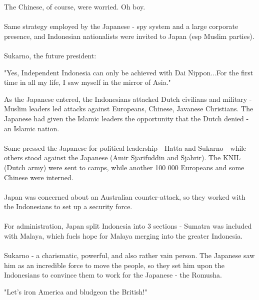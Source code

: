 \documentclass[a4paper]{article}
\begin{document}
\noindent The Chinese, of course, were worried. Oh boy.\\
\\
Same strategy employed by the Japanese - spy system and a large corporate presence, and Indonesian nationalists were invited to Japan (esp Muslim parties).\\
\\
Sukarno, the future president:
\begin{framed}
	\begin{displayquote}
		"Yes, Independent Indonesia can only be achieved with Dai Nippon...For the first time in all my life, I saw myself in the mirror of Asia."
	\end{displayquote}
\end{framed}

\noindent As the Japanese entered, the Indonesians attacked Dutch civilians and military - Muslim leaders led attacks against Europeans, Chinese, Javanese Christians. The Japanese had given the Islamic leaders the opportunity that the Dutch denied - an Islamic nation.\\
\\
Some pressed the Japanese for political leadership - Hatta and Sukarno - while others stood against the Japanese (Amir Sjarifuddin and Sjahrir). The KNIL (Dutch army) were sent to camps, while another 100 000 Europeans and some Chinese were interned.\\
\\
Japan was concerned about an Australian counter-attack, so they worked with the Indonesians to set up a security force.\\
\\
For administration, Japan split Indonesia into 3 sections - Sumatra was included with Malaya, which fuels hope for Malaya merging into the greater Indonesia.\\
\\
Sukarno - a charismatic, powerful, and also rather vain person. The Japanese saw him as an incredible force to move the people, so they set him upon the Indonesians to convince them to work for the Japanese - the Romusha.
\begin{framed}
	\begin{displayquote}
		"Let's iron America and bludgeon the British!"
	\end{displayquote}
\end{framed}
\end{document}
